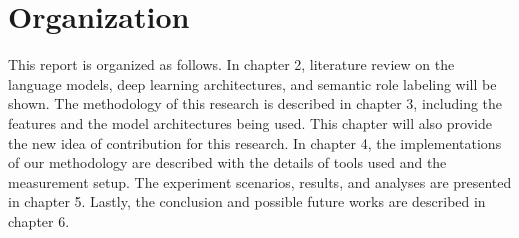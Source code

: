 
\section{Organization}
This report is organized as follows. In chapter 2, literature review on the language models, deep learning architectures, and semantic role labeling will be shown. The methodology of this research is described in chapter 3, including the features and the model architectures being used. This chapter will also provide the new idea of contribution for this research. In chapter 4, the implementations of our methodology are described with the details of tools used and the measurement setup. The experiment scenarios, results, and analyses are presented in chapter 5. Lastly, the conclusion and possible future works are described in chapter 6.

